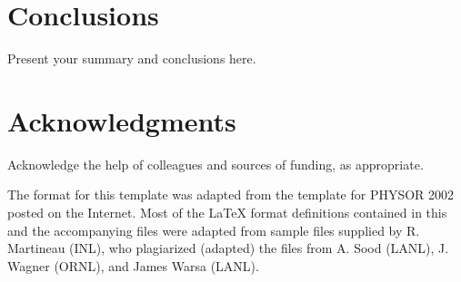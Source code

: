 \documentclass{ansconf}
\begin{document}
\section{Conclusions}

Present your summary and conclusions here.


\section*{Acknowledgments}

Acknowledge the help of colleagues and sources of funding, as appropriate.

The format for this template was adapted from the template for PHYSOR 2002 
posted on the Internet.  Most of the {\LaTeX} format definitions contained
in this and the accompanying files were adapted from sample files supplied 
by R. Martineau (INL), who plagiarized (adapted) the files from A. Sood 
(LANL), J. Wagner (ORNL), and James Warsa (LANL).


\setlength{\baselineskip}{12pt}



\end{document}
